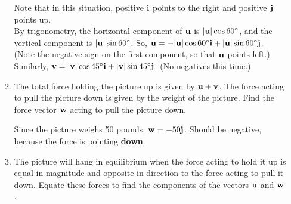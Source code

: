 \begin{enumerate}[leftmargin=0pt]
\begin{enumerate}
        \begin{red}
        Note that in this situation, positive $\mathbf{i}$ points to the right and positive $\mathbf{j}$ points up.\\
        By trigonometry, the horizontal component of $\mathbf{u}$ is $|\mathbf{u}|\cos60^\circ$, and the vertical component is $|\mathbf{u}|\sin60^\circ$. So, $\mathbf{u} = -|\mathbf{u}|\cos60^\circ \mathbf{i} + |\mathbf{u}|\sin60^\circ \mathbf{j}$. (Note the negative sign on the first component, so that $\mathbf{u}$ points left.)\\
        Similarly, $\mathbf{v} = |\mathbf{v}|\cos45^\circ \mathbf{i} + |\mathbf{v}|\sin45^\circ \mathbf{j}$. (No negatives this time.)
        \end{red}
        \item The total force holding the picture up is given by $\mathbf{u} + \mathbf{v}$. The force acting to pull the picture down is given by the weight of the picture. Find the force vector $\mathbf{w}$ acting to pull the picture down.
        
        \begin{red}
        Since the picture weighs 50 pounds, $\mathbf{w} = -50\mathbf{j}$. Should be negative, because the force is pointing \textbf{down}.
        \end{red}
        \item The picture will hang in equilibrium when the force acting to hold it up is equal in magnitude and opposite in direction to the force acting to pull it down. Equate these forces to find the components of the vectors $\mathbf{u}$ and $\mathbf{w}$.
        

\end{enumerate}
\end{enumerate}
